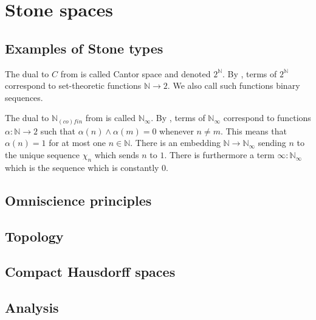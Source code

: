 \documentclass{../util/zariski-small}
\begin{document}
\section{Stone spaces}
\subsection{Examples of Stone types}
\begin{example}
  The dual to $C$ from  is called Cantor space 
  and denoted $2^\mathbb N$. 
  By , terms of $2^\mathbb N$ 
  correspond to set-theoretic functions $\mathbb N \to 2$. 
  We also call such functions binary sequences. 
\end{example}
\begin{example}
  The dual to $\mathbb N_{(co)fin}$ from  is called 
  $\mathbb N_\infty$. By , terms of $\mathbb N_\infty$ 
  correspond to functions $\alpha: \mathbb N \to 2$ such that $\alpha(n) \wedge \alpha(m) = 0$ 
  whenever $n \neq m$. This means that $\alpha(n) = 1$ for at most one $n\in\mathbb N$. 
  There is an embedding $\mathbb N \to \mathbb N_\infty$ sending $n$ to the unique sequence $\chi_n$
  which sends $n$ to $1$. 
  There is furthermore a term $\infty:\mathbb N_\infty$ which is the sequence which is constantly $0$. 
\end{example}

\subsection{Omniscience principles}

\subsection{Topology}

\subsection{Compact Hausdorff spaces}
\subsection{Analysis}


%
\end{document}
